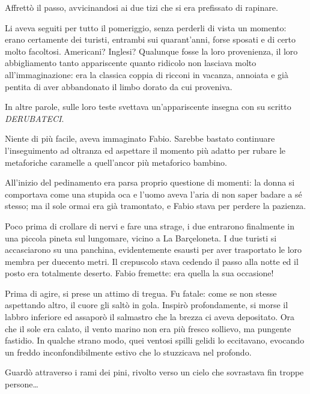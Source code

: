 Affrettò il passo, avvicinandosi ai due tizi che si era prefissato di rapinare. 

Li aveva seguiti per tutto il pomeriggio, senza perderli di vista un momento: erano certamente dei turisti, entrambi sui quarant'anni, forse sposati e di certo molto facoltosi. Americani? Inglesi? Qualunque fosse la loro provenienza, il loro abbigliamento tanto appariscente quanto ridicolo non lasciava molto all'immaginazione: era la classica coppia di ricconi in vacanza, annoiata e già pentita di aver abbandonato il limbo dorato da cui proveniva. 

In altre parole, sulle loro teste svettava un'appariscente insegna con su scritto \textit{DERUBATECI}. 

Niente di più facile, aveva immaginato Fabio. Sarebbe bastato continuare l'inseguimento ad oltranza ed aspettare il momento più adatto per rubare le metaforiche caramelle a quell'ancor più metaforico bambino. 

All'inizio del pedinamento era parsa proprio questione di momenti: la donna si comportava come una stupida oca e l'uomo aveva l'aria di non saper badare a sé stesso; ma il sole ormai era già tramontato, e Fabio stava per perdere la pazienza.

Poco prima di crollare di nervi e fare una strage, i due entrarono finalmente in una piccola pineta sul lungomare, vicino a La Barçeloneta. I due turisti si accasciarono su una panchina, evidentemente esausti per aver trasportato le loro membra per duecento metri. Il crepuscolo stava cedendo il passo alla notte ed il posto era totalmente deserto. Fabio fremette: era quella la sua occasione!

Prima di agire, si prese un attimo di tregua. Fu fatale: come se non stesse aspettando altro, il cuore gli saltò in gola. Inspirò profondamente, si morse il labbro inferiore ed assaporò il salmastro che la brezza ci aveva depositato. Ora che il sole era calato, il vento marino non era più fresco sollievo, ma pungente fastidio. In qualche strano modo, quei ventosi spilli gelidi lo eccitavano, evocando un freddo inconfondibilmente estivo che lo stuzzicava nel profondo. 

Guardò attraverso i rami dei pini, rivolto verso un cielo che sovrastava fin troppe persone\ldots

